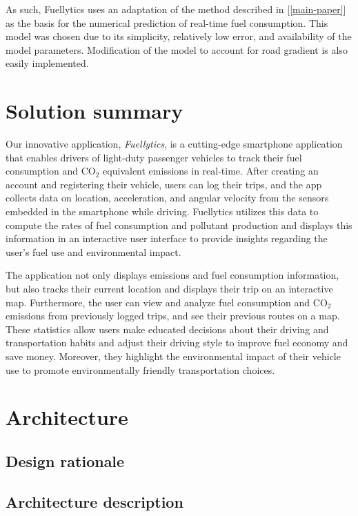 \documentclass[11pt, oneside]{article}
\begin{document}
As such, Fuellytics uses an adaptation of the method described in [\ref*{main-paper}] as the basis for the numerical prediction of real-time fuel consumption.  This model was chosen due to its simplicity, relatively low error, and availability of the model parameters.  Modification of the model to account for road gradient is also easily implemented.

\section{Solution summary}

Our innovative application, \textit{Fuellytics}, is a cutting-edge smartphone application that enables drivers of light-duty passenger vehicles to track their fuel consumption and CO$_2$ equivalent emissions in real-time.  After creating an account and registering their vehicle, users can log their trips, and the app collects data on location, acceleration, and angular velocity from the sensors embedded in the smartphone while driving.  Fuellytics utilizes this data to compute the rates of fuel consumption and pollutant production and displays this information in an interactive user interface to provide insights regarding the user's fuel use and environmental impact. 

The application not only displays emissions and fuel consumption information, but also tracks their current location and displays their trip on an interactive map.  Furthermore, the user can view and analyze fuel consumption and CO$_2$ emissions from previously logged trips, and see their previous routes on a map. These statistics allow users make educated decisions about their driving and transportation habits and adjust their driving style to improve fuel economy and save money.  Moreover, they highlight the environmental impact of their vehicle use to promote environmentally friendly transportation choices.

\section{Architecture}

\subsection{Design rationale}

\subsection{Architecture description}
\end{document}
